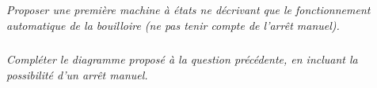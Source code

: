 \documentclass[10pt]{article}
\begin{document}
\subparagraph{}
\textit{Proposer une première machine à états ne décrivant que le fonctionnement automatique de la bouilloire (ne pas tenir compte de l’arrêt manuel).}


\subparagraph{}
\textit{Compléter le diagramme proposé à la question précédente, en incluant la possibilité d’un arrêt manuel.}


\end{document}
